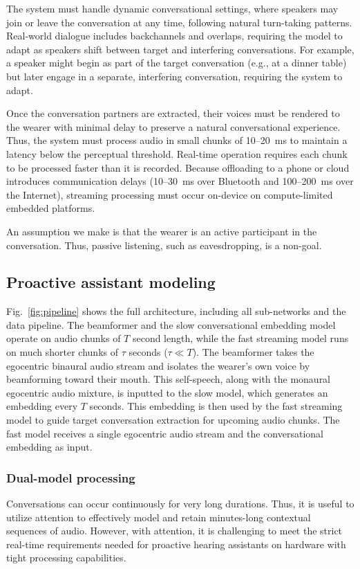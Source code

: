 The system must handle dynamic conversational settings, where speakers may join or leave the conversation at any time, following natural turn-taking patterns. Real-world dialogue includes backchannels and overlaps, requiring the model to adapt as speakers shift between target and interfering conversations. For example, a speaker might begin as part of the target conversation (e.g., at a dinner table) but later engage in a separate, interfering conversation, requiring the system to adapt.





Once the conversation partners are extracted, their voices must be rendered to the wearer with minimal delay to preserve a natural conversational experience. Thus, the system must process audio in small chunks of 10–20~ms to maintain a  latency below the perceptual threshold. Real-time operation requires each chunk to be processed faster than it is recorded. Because offloading to a phone or cloud introduces communication delays (10–30~ms over Bluetooth and 100–200~ms over the Internet),  streaming processing must occur on-device on compute-limited embedded platforms.

An assumption we make is that the wearer is an active participant in the conversation. Thus, passive listening, such as eavesdropping, is a non-goal. 

\subsection{Proactive assistant modeling}\label{sec:modeling}
Fig.~\ref{fig:pipeline} shows the full  architecture, including all sub-networks and the data pipeline. The beamformer and the slow conversational embedding model operate on audio chunks of $T$ second length, while the fast streaming model runs on much shorter chunks of $\tau$ seconds ($\tau \ll T$). The beamformer takes the egocentric binaural audio stream and isolates the wearer's own voice by beamforming toward their mouth. This self-speech, along with the monaural egocentric audio mixture, is inputted to the slow  model, which generates an embedding every $T$ seconds. This embedding is then used by the fast streaming model to guide target conversation extraction for upcoming audio chunks. The fast model receives  a single egocentric audio stream and the conversational embedding as input.





\subsubsection{Dual-model processing}\label{sec:dual}
Conversations can occur continuously for very long durations. Thus, it is useful to utilize attention to effectively model and retain minutes-long contextual sequences of audio. However, with attention, it is challenging to meet the strict real-time requirements needed for proactive hearing assistants on hardware with tight processing capabilities. 

